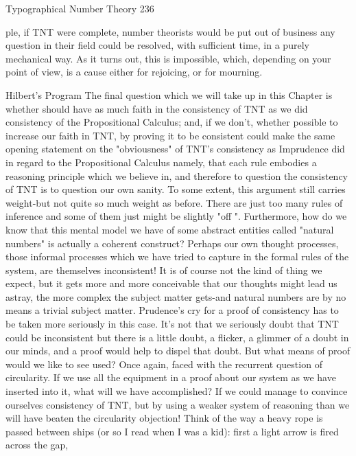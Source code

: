 Typographical Number Theory                                                             236

ple, if TNT were complete, number theorists would be put out of business any question
in their field could be resolved, with sufficient time, in a purely mechanical way. As it
turns out, this is impossible, which, depending on your point of view, is a cause either for
rejoicing, or for mourning.


                                      Hilbert's Program
        The final question which we will take up in this Chapter is whether should have
as much faith in the consistency of TNT as we did consistency of the Propositional
Calculus; and, if we don't, whether possible to increase our faith in TNT, by proving it to
be consistent could make the same opening statement on the "obviousness" of TNT’s
consistency as Imprudence did in regard to the Propositional Calculus namely, that each
rule embodies a reasoning principle which we believe in, and therefore to question the
consistency of TNT is to question our own sanity. To some extent, this argument still
carries weight-but not quite so much weight as before. There are just too many rules of
inference and some of them just might be slightly "off ". Furthermore, how do we know
that this mental model we have of some abstract entities called "natural numbers" is
actually a coherent construct? Perhaps our own thought processes, those informal
processes which we have tried to capture in the formal rules of the system, are themselves
inconsistent! It is of course not the kind of thing we expect, but it gets more and more
conceivable that our thoughts might lead us astray, the more complex the subject matter
gets-and natural numbers are by no means a trivial subject matter. Prudence's cry for a
proof of consistency has to be taken more seriously in this case. It's not that we seriously
doubt that TNT could be inconsistent but there is a little doubt, a flicker, a glimmer of a
doubt in our minds, and a proof would help to dispel that doubt.
        But what means of proof would we like to see used? Once again, faced with the
recurrent question of circularity. If we use all the equipment in a proof about our system
as we have inserted into it, what will we have accomplished? If we could manage to
convince ourselves consistency of TNT, but by using a weaker system of reasoning than
we will have beaten the circularity objection! Think of the way a heavy rope is passed
between ships (or so I read when I was a kid): first a light arrow is fired across the gap,
